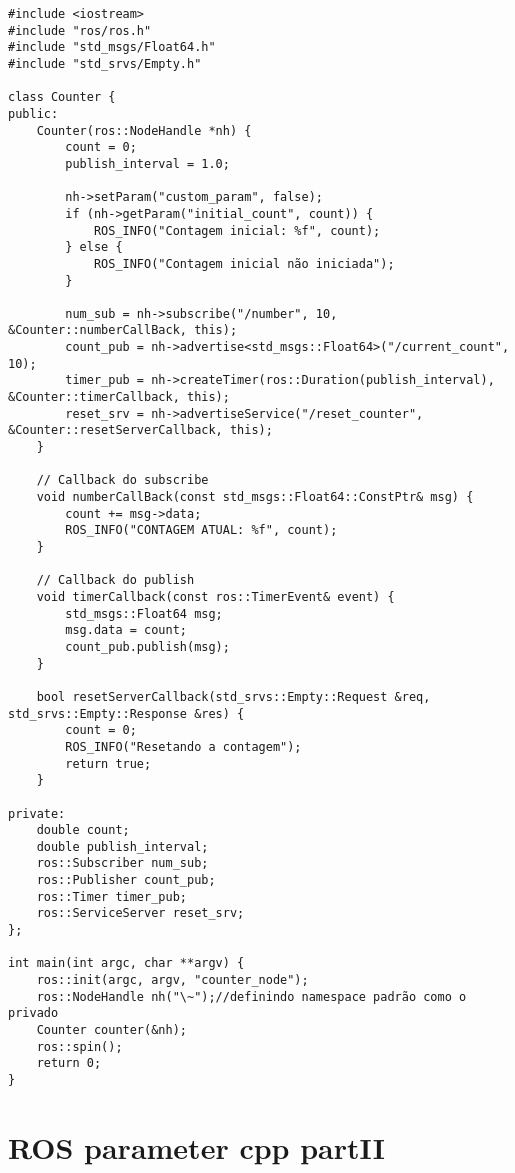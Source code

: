 \documentclass[letterpaper]{article}
\begin{document}
\begin{lstlisting}[style=pythonStyle, title=counter.cpp] 
	#include <iostream>
#include "ros/ros.h"
#include "std_msgs/Float64.h"
#include "std_srvs/Empty.h"

class Counter {
public:
    Counter(ros::NodeHandle *nh) {
        count = 0;
        publish_interval = 1.0;

        nh->setParam("custom_param", false);
        if (nh->getParam("initial_count", count)) {
            ROS_INFO("Contagem inicial: %f", count);
        } else {
            ROS_INFO("Contagem inicial não iniciada");
        }

        num_sub = nh->subscribe("/number", 10, &Counter::numberCallBack, this);
        count_pub = nh->advertise<std_msgs::Float64>("/current_count", 10);
        timer_pub = nh->createTimer(ros::Duration(publish_interval), &Counter::timerCallback, this);
        reset_srv = nh->advertiseService("/reset_counter", &Counter::resetServerCallback, this);
    }

    // Callback do subscribe
    void numberCallBack(const std_msgs::Float64::ConstPtr& msg) {
        count += msg->data;
        ROS_INFO("CONTAGEM ATUAL: %f", count);
    }

    // Callback do publish
    void timerCallback(const ros::TimerEvent& event) {
        std_msgs::Float64 msg;
        msg.data = count;
        count_pub.publish(msg);
    }

    bool resetServerCallback(std_srvs::Empty::Request &req, std_srvs::Empty::Response &res) {
        count = 0;
        ROS_INFO("Resetando a contagem");
        return true;
    }

private:
    double count;
    double publish_interval;
    ros::Subscriber num_sub;
    ros::Publisher count_pub;
    ros::Timer timer_pub;
    ros::ServiceServer reset_srv;
};

int main(int argc, char **argv) {
    ros::init(argc, argv, "counter_node");
    ros::NodeHandle nh("\~");//definindo namespace padrão como o privado
    Counter counter(&nh);
    ros::spin();
    return 0;
}
\end{lstlisting}
\section{ROS parameter cpp partII}
\end{document}
